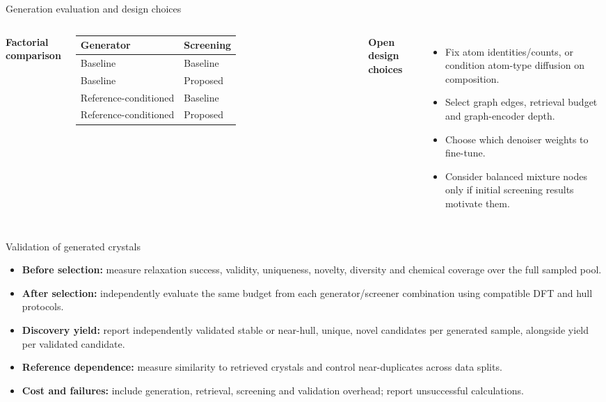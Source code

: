 \documentclass[10pt,aspectratio=169]{beamer}
\begin{document}
\begin{frame}{Generation evaluation and design choices}
\begin{columns}[T]
\textbf{Factorial comparison}\par\vspace{2mm}
\small\begin{tabular}{ll}\toprule
Generator & Screening \\\midrule
Baseline & Baseline \\
Baseline & Proposed \\
Reference-conditioned & Baseline \\
Reference-conditioned & Proposed \\\bottomrule
\end{tabular}
\vspace{3mm}
\textbf{Open design choices}
\begin{itemize}\setlength\itemsep{3mm}
\item Fix atom identities/counts, or condition atom-type diffusion on composition.
\item Select graph edges, retrieval budget and graph-encoder depth.
\item Choose which denoiser weights to fine-tune.
\item Consider balanced mixture nodes only if initial screening results motivate them.
\end{itemize}
\end{columns}
\end{frame}

\begin{frame}{Validation of generated crystals}
\begin{itemize}\setlength\itemsep{3mm}
\item \textbf{Before selection:} measure relaxation success, validity, uniqueness, novelty, diversity and chemical coverage over the full sampled pool.
\item \textbf{After selection:} independently evaluate the same budget from each generator/screener combination using compatible DFT and hull protocols.
\item \textbf{Discovery yield:} report independently validated stable or near-hull, unique, novel candidates per generated sample, alongside yield per validated candidate.
\item \textbf{Reference dependence:} measure similarity to retrieved crystals and control near-duplicates across data splits.
\item \textbf{Cost and failures:} include generation, retrieval, screening and validation overhead; report unsuccessful calculations.
\end{itemize}
\vspace{3mm}
\end{frame}
\end{document}
